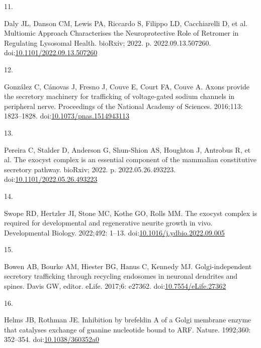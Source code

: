 \documentclass[
  12pt,
  a4paper,
]{article}
\newlength{\cslhangindent}
\newlength{\csllabelwidth}
\newlength{\cslentryspacingunit} %
\newenvironment{CSLReferences}[2] %
 {%
  \setlength{\parindent}{0pt}
  \ifodd #1
  \let\oldpar\par
  \def\par{\hangindent=\cslhangindent\oldpar}
  \fi
  \setlength{\parskip}{#2\cslentryspacingunit}
 }%
 {}
\newcommand{\CSLLeftMargin}[1]{\parbox[t]{\csllabelwidth}{#1}}
\newcommand{\CSLRightInline}[1]{\parbox[t]{\linewidth - \csllabelwidth}{#1}\break}
\begin{document}
\begin{CSLReferences}{0}{0}
\leavevmode{}%
\CSLLeftMargin{11. }%
\CSLRightInline{Daly JL, Danson CM, Lewis PA, Riccardo S, Filippo LD,
Cacchiarelli D, et al. Multiomic {Approach Characterises} the
{Neuroprotective Role} of {Retromer} in {Regulating Lysosomal Health}.
{bioRxiv}; 2022. p. 2022.09.13.507260.
doi:\href{https://doi.org/10.1101/2022.09.13.507260}{10.1101/2022.09.13.507260}}

\leavevmode{}%
\CSLLeftMargin{12. }%
\CSLRightInline{González C, Cánovas J, Fresno J, Couve E, Court FA,
Couve A. Axons provide the secretory machinery for trafficking of
voltage-gated sodium channels in peripheral nerve. Proceedings of the
National Academy of Sciences. 2016;113: 1823--1828.
doi:\href{https://doi.org/10.1073/pnas.1514943113}{10.1073/pnas.1514943113}}

\leavevmode{}%
\CSLLeftMargin{13. }%
\CSLRightInline{Pereira C, Stalder D, Anderson G, Shun-Shion AS,
Houghton J, Antrobus R, et al. The exocyst complex is an essential
component of the mammalian constitutive secretory pathway. {bioRxiv};
2022. p. 2022.05.26.493223.
doi:\href{https://doi.org/10.1101/2022.05.26.493223}{10.1101/2022.05.26.493223}}

\leavevmode{}%
\CSLLeftMargin{14. }%
\CSLRightInline{Swope RD, Hertzler JI, Stone MC, Kothe GO, Rolls MM. The
exocyst complex is required for developmental and regenerative neurite
growth in vivo. Developmental Biology. 2022;492: 1--13.
doi:\href{https://doi.org/10.1016/j.ydbio.2022.09.005}{10.1016/j.ydbio.2022.09.005}}

\leavevmode{}%
\CSLLeftMargin{15. }%
\CSLRightInline{Bowen AB, Bourke AM, Hiester BG, Hanus C, Kennedy MJ.
Golgi-independent secretory trafficking through recycling endosomes in
neuronal dendrites and spines. Davis GW, editor. eLife. 2017;6: e27362.
doi:\href{https://doi.org/10.7554/eLife.27362}{10.7554/eLife.27362}}

\leavevmode{}%
\CSLLeftMargin{16. }%
\CSLRightInline{Helms JB, Rothman JE. Inhibition by brefeldin {A} of a
{Golgi} membrane enzyme that catalyses exchange of guanine nucleotide
bound to {ARF}. Nature. 1992;360: 352--354.
doi:\href{https://doi.org/10.1038/360352a0}{10.1038/360352a0}}


\end{CSLReferences}
\end{document}
